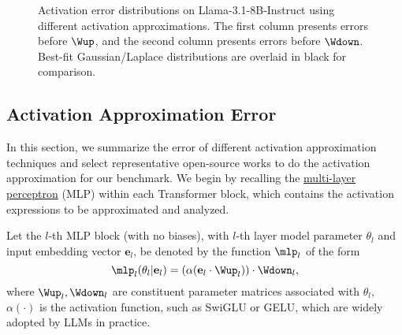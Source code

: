 
\begin{figure}[!t]
    \centering
    \hfil
    \hfil
    \caption{Activation error distributions on Llama-3.1-8B-Instruct using different activation approximations. The first column presents errors before $\Wup$, and the second column presents errors before $\Wdown$. Best-fit Gaussian/Laplace distributions are overlaid in black for comparison.}
    \label{fig:error_distributaion}
\end{figure}

\subsection{Activation Approximation Error} \label{sec:error}
In this section, we summarize the error of different activation approximation techniques and select representative open-source works to do the activation approximation for our benchmark. We begin by recalling the \ul{multi-layer perceptron} (MLP) within each Transformer block, which contains the activation expressions to be approximated and analyzed. 

\begin{definition}
Let the $l$-th MLP block (with no biases), with $l$-th layer model parameter $\theta_l$ and input embedding vector $\mathbf{e}_{l}$, be denoted by the function $\mlp_l$  of the form
$$
    \mlp_l(\theta_l|\mathbf{e}_{l}) = (\alpha(\mathbf{e}_{l}\cdot \Wup_l))\cdot\Wdown_l, 
$$
where $\Wup_l, \Wdown_l$ are constituent parameter matrices associated with $\theta_l$, $\alpha(\cdot)$ is the activation function, such as SwiGLU or GELU, which are widely adopted by LLMs in practice. 
\end{definition}


